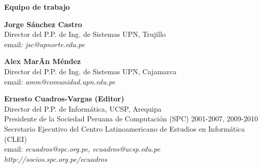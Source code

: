 \begin{center}
{\bf \Huge Equipo de trabajo}
\end{center}
\vspace{1cm}

\begin{center}
\textbf{Jorge Sánchez Castro}\\
Director del P.P. de Ing. de Sistemas UPN, Trujillo\\
email: \textit{jsc@upnorte.edu.pe}\\
\end{center}

\begin{center}
\textbf{Alex MarÃ­n Méndez}\\
Director del P.P. de Ing. de Sistemas UPN, Cajamarca\\
email: \textit{amm@comunidad.upn.edu.pe}\\
\end{center}


\begin{center}
\textbf{Ernesto Cuadros-Vargas (Editor)}\\
Director del P.P. de Informática, UCSP, Arequipa\\ %
Presidente de la Sociedad Peruana de Computación (SPC) 2001-2007, 2009-2010\\
Secretario Ejecutivo del Centro Latinoamericano de Estudios en Informática (CLEI)\\
email: \textit{ecuadros@spc.org.pe, ecuadros@ucsp.edu.pe}\\
\textit{http://socios.spc.org.pe/ecuadros}
\end{center}


